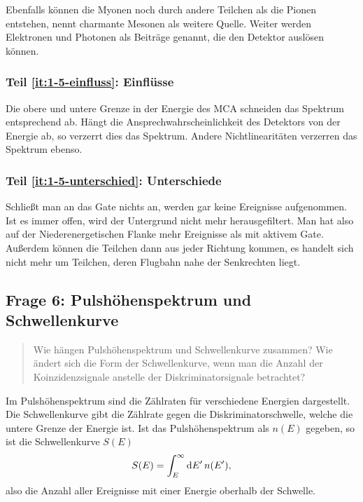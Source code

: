 \documentclass[11pt, ngerman, fleqn, DIV=15, headinclude, BCOR=2cm]{scrreprt}
\begin{document}
Ebenfalls können die Myonen noch durch andere Teilchen als die Pionen
entstehen, \parencite[115]{Grupen/Astroteilchenphysik} nennt charmante Mesonen
als weitere Quelle. Weiter werden Elektronen und Photonen als Beiträge genannt,
die den Detektor auslösen können.

\subsubsection{Teil \ref{it:1-5-einfluss}: Einflüsse}

Die obere und untere Grenze in der Energie des MCA schneiden das Spektrum
entsprechend ab. Hängt die Ansprechwahrscheinlichkeit des Detektors von der
Energie ab, so verzerrt dies das Spektrum. Andere Nichtlinearitäten verzerren
das Spektrum ebenso.


\subsubsection{Teil \ref{it:1-5-unterschied}: Unterschiede}

Schließt man an das Gate nichts an, werden gar keine Ereignisse aufgenommen.
Ist es immer offen, wird der Untergrund nicht mehr herausgefiltert. Man hat
also auf der Niederenergetischen Flanke mehr Ereignisse als mit aktivem Gate.
Außerdem können die Teilchen dann aus jeder Richtung kommen, es handelt sich
nicht mehr um Teilchen, deren Flugbahn nahe der Senkrechten liegt.

\subsection{Frage 6: Pulshöhenspektrum und Schwellenkurve}

\begin{quote}
    Wie hängen Pulshöhenspektrum und Schwellenkurve zusammen? Wie ändert sich
    die Form der Schwellenkurve, wenn man die Anzahl der Koinzidenzsignale
    anstelle der Diskriminatorsignale betrachtet?
\end{quote}

Im Pulshöhenspektrum sind die Zählraten für verschiedene Energien dargestellt.
Die Schwellenkurve gibt die Zählrate gegen die Diskriminatorschwelle, welche
die untere Grenze der Energie ist. Ist das Pulshöhenspektrum als $n(E)$
gegeben, so ist die Schwellenkurve $S(E)$
\[
    S(E) = \int_E^\infty \dif E' \, n(E'),
\]
also die Anzahl aller Ereignisse mit einer Energie oberhalb der Schwelle.
\end{document}
